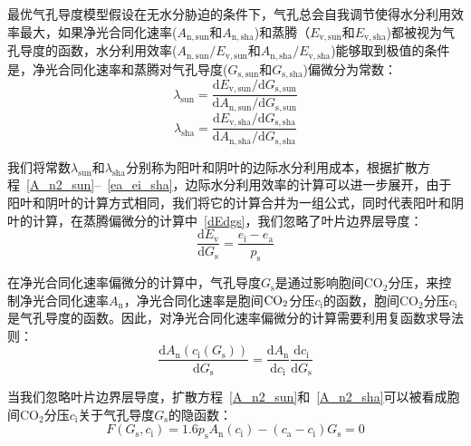最优气孔导度模型假设在无水分胁迫的条件下，气孔总会自我调节使得水分利用效率最大，如果净光合同化速率($ A_{\mathrm{n,sun}}$和$ A_{\mathrm{n,sha}}$)和蒸腾（$ E_{\mathrm{v,sun}}$和$ E_{\mathrm{v,sha}}$)都被视为气孔导度的函数，水分利用效率($ A_{\mathrm{n,sun}}/E_{\mathrm{v,sun}}$和$ A_{\mathrm{n,sha}}/E_{\mathrm{v,sha}}$)能够取到极值的条件是，净光合同化速率和蒸腾对气孔导度($ G_{\mathrm{s,sun}}$和$ G_{\mathrm{s,sha}}$)偏微分为常数：
\begin{equation}\label{lambda_sun}
\lambda_{\mathrm{sun}}=\frac{\mathrm{d} E_{\mathrm{v,sun}}/\mathrm{d} G_{\mathrm{s,sun}}}{\mathrm{d} A_{\mathrm{n,sun}}/\mathrm{d} G_{\mathrm{s,sun}}}
\end{equation}
\begin{equation}\label{lambda_sha}
\lambda_{\mathrm{sha}}=\frac{\mathrm{d} E_{\mathrm{v,sha}}/\mathrm{d} G_{\mathrm{s,sha}}}{\mathrm{d} A_{\mathrm{n,sha}}/\mathrm{d} G_{\mathrm{s,sha}}}
\end{equation}

我们将常数$\lambda_{\mathrm{sun}}$和$\lambda_{\mathrm{sha}}$分别称为阳叶和阴叶的边际水分利用成本，根据扩散方程~\eqref{A_n2_sun}--~\eqref{ea_ei_sha}，边际水分利用效率的计算可以进一步展开，由于阳叶和阴叶的计算方式相同，我们将它的计算合并为一组公式，同时代表阳叶和阴叶的计算，在蒸腾偏微分的计算中~\eqref{dEdgs}，我们忽略了叶片边界层导度：
\begin{equation}\label{dEdgs}
\frac{\mathrm{d} E_{\mathrm{v}}}{\mathrm{d} G_{\mathrm{s}}}=\frac{e_{\mathrm{i}}-e_{\mathrm{a}}}{p_{\mathrm{s}}}
\end{equation}

在净光合同化速率偏微分的计算中，气孔导度$G_{\mathrm{s}}$是通过影响胞间$\mathrm {CO_2}$分压，来控制净光合同化速率$A_{\mathrm{n}}$，净光合同化速率是胞间$\rm CO_2$分压$c_{\mathrm{i}}$的函数，胞间$\mathrm {CO_2}$分压$c_{\mathrm{i}}$是气孔导度的函数。因此，对净光合同化速率偏微分的计算需要利用复函数求导法则：
\begin{equation}\label{dAdgs1}
\frac{\mathrm{d} A_{\mathrm{n}}\left(c_{\mathrm{i}}\left(G_{\mathrm{s}}\right)\right)}{\mathrm{d} G_{\mathrm{s}}}= \frac{\mathrm{d} A_{\mathrm{n}}}{\mathrm{d} c_{\mathrm{i}}}\frac{\mathrm{d} c_{\mathrm{i}}}{\mathrm{d} G_{\mathrm{s}}}
\end{equation}

当我们忽略叶片边界层导度，扩散方程~\eqref{A_n2_sun}和~\eqref{A_n2_sha}可以被看成胞间$\mathrm {CO_2}$分压$c_{\mathrm{i}}$关于气孔导度$G_{\mathrm{s}}$的隐函数：
\begin{equation}\label{cigsimplicit}
F\left(G_{\mathrm{s}},c_{\mathrm{i}}\right)=1.6p_{\mathrm{s}}A_{\mathrm{n}}\left(c_{\mathrm{i}}\right)-\left(c_{\mathrm{a}}-c_{\mathrm{i}}\right) G_{\mathrm{s}}=0
\end{equation}

